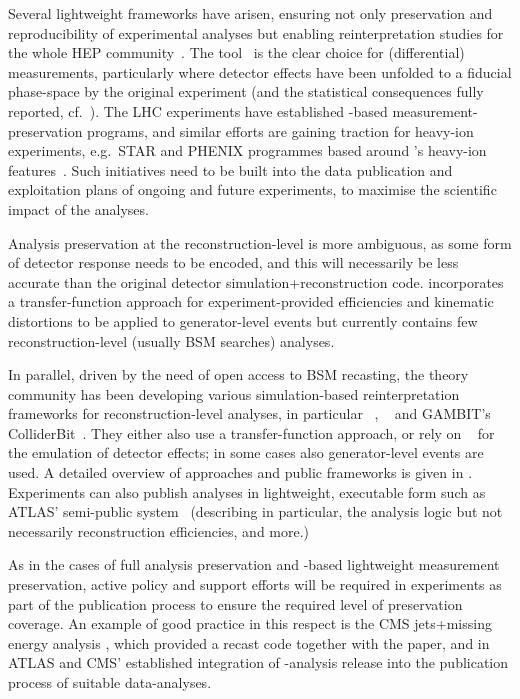\documentclass[11pt]{article}
\begin{document}
Several lightweight frameworks have arisen, ensuring not only preservation and reproducibility of experimental analyses but enabling \gls{reinterpretation} studies for the whole \gls{HEP} community~\cite{LHCReinterpretationForum:2020xtr}. The \rivet tool~\cite{Bierlich:2019rhm} is the clear choice for (differential) measurements, particularly where detector effects have been unfolded to a fiducial phase-space by the original experiment (and the statistical consequences fully reported, cf.~). The \gls{LHC} experiments have established \rivet-based measurement-preservation programs, and similar efforts are gaining traction for heavy-ion experiments, e.g.~\gls{STAR} and \gls{PHENIX} programmes based around \rivet's heavy-ion features~\cite{Bierlich:2020wms}. Such initiatives need to be built into the data publication and exploitation plans of ongoing and future experiments, to maximise the scientific impact of the analyses.

Analysis preservation at the reconstruction-level is more ambiguous, as some form of detector response needs to be encoded, and this will necessarily be less accurate than the original detector simulation+reconstruction code.
\rivet incorporates a transfer-function approach for experiment-provided efficiencies and kinematic distortions to be applied to generator-level events but currently contains few reconstruction-level (usually \gls{BSM} searches) analyses.

In parallel, driven by the need of open access to \gls{BSM} recasting, the theory community has been developing various simulation-based reinterpretation frameworks for reconstruction-level analyses, in particular \checkmate~\cite{Drees:2013wra,Dercks:2016npn}, \madanalysis~\cite{Dumont:2014tja,Conte:2018vmg} and GAMBIT's ColliderBit~\cite{GAMBIT:2017qxg}. They either also use a transfer-function approach, or rely on \delphes~\cite{deFavereau:2013fsa} for the emulation of detector effects; in some cases also generator-level events are used. A detailed overview of approaches and public frameworks is given in \cite{LHCReinterpretationForum:2020xtr}.
%
Experiments can also publish analyses in lightweight, executable form such as \gls{ATLAS}' semi-public \simpleanalysis system~\cite{atlas:simpleanalysis} 
(describing in particular, the analysis logic but not necessarily reconstruction efficiencies, and more.)

As in the cases of full analysis preservation and \rivet-based lightweight measurement preservation, active policy and support efforts will be required in experiments as part of the publication process to ensure the required level of preservation coverage. An example of good practice in this respect is the \gls{CMS} jets+missing energy analysis \cite{CMS:2021far}, which provided a \madanalysis recast code \cite{Albert:2774586,DVN/IRF7ZL_2021} together with the paper, and in \gls{ATLAS} and \gls{CMS}' established integration of \rivet-analysis release into the publication process of suitable data-analyses.
\end{document}
